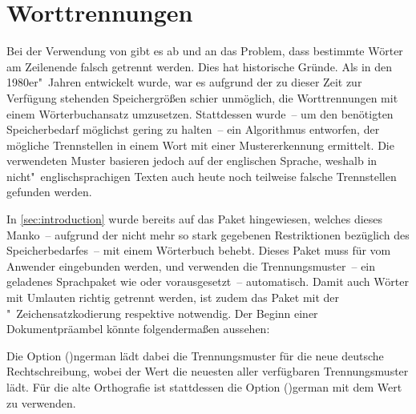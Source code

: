 \documentclass[%
  english,ngerman,%
  cdgeometry=no,DIV=12,%
  cd=false,cdfont=false,cdtitle=true,%
  headings=normal,%
  automark,%
  listof=toc,%
]{tudscrartcl}
\begin{document}
\section{%
  Worttrennungen%
  \label{sec:hyphenation}%
}

Bei der Verwendung von  gibt es ab und an das Problem, dass 
bestimmte Wörter am Zeilenende falsch getrennt werden. Dies hat historische 
Gründe. Als  in den 1980er"~Jahren entwickelt wurde, war es 
aufgrund der zu dieser Zeit zur Verfügung stehenden Speichergrößen schier 
unmöglich, die Worttrennungen mit einem Wörterbuchansatz umzusetzen. 
Stattdessen wurde~-- um den benötigten Speicherbedarf möglichst gering zu 
halten~-- ein Algorithmus entworfen, der mögliche Trennstellen in einem Wort 
mit einer Mustererkennung ermittelt. Die verwendeten Muster basieren jedoch 
auf der englischen Sprache, weshalb in nicht"~englischsprachigen Texten auch 
heute noch teilweise falsche Trennstellen gefunden werden.

In \autoref{sec:introduction} wurde bereits auf das Paket 
 hingewiesen, welches dieses Manko~-- aufgrund der nicht 
mehr so stark gegebenen Restriktionen bezüglich des Speicherbedarfes~-- mit 
einem Wörterbuch behebt. Dieses Paket muss für  vom Anwender 
eingebunden werden,  und  verwenden die 
Trennungsmuster~-- ein geladenes Sprachpaket wie  oder 
 vorausgesetzt~-- automatisch. Damit auch Wörter mit Umlauten 
richtig getrennt werden, ist zudem das Paket  mit der 
"~Zeichensatzkodierung respektive  notwendig. Der 
Beginn einer Dokumentpräambel könnte folgendermaßen aussehen:
%

Die Option \Option(){ngerman} lädt dabei die Trennungsmuster 
für die neue deutsche Rechtschreibung, wobei der Wert  
die neuesten aller verfügbaren Trennungsmuster lädt. Für die alte Orthografie 
ist stattdessen die Option \Option(){german} mit dem Wert 
 zu verwenden.
\end{document}
